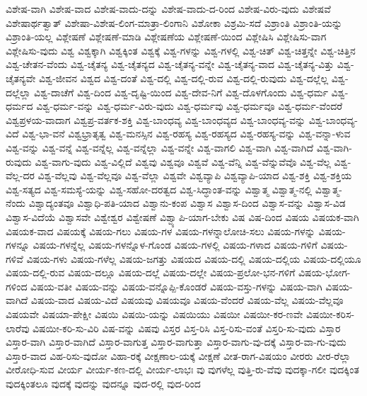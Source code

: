 {ವಿಶೇಷ-ವಾಗಿ
ವಿಶೇಷ-ವಾದ
ವಿಶೇಷ-ವಾದು-ದನ್ನು
ವಿಶೇಷ-ವಾದು-ದ-ರಿಂದ
ವಿಶೇಷ-ವಿರು-ವುದು
ವಿಶೇಷವೆ
ವಿಶೇಷಾರ್ಥತ್ವಾತ್
ವಿಶೇಷಾ-ವಿಶೇಷ-ಲಿಂಗ-ಮಾತ್ರಾ-ಲಿಂಗಾನಿ
ವಿಶೋಕಾ
ವಿಶ್ರಮಿ-ಸದೆ
ವಿಶ್ರಾಂತಿ
ವಿಶ್ರಾಂತಿ-ಯನ್ನು
ವಿಶ್ರಾಂತಿ-ಯಲ್ಲ
ವಿಶ್ಲೇಷಣೆ
ವಿಶ್ಲೇಷಣೆ-ಮಾಡಿ
ವಿಶ್ಲೇಷಣೆಯ
ವಿಶ್ಲೇಷಣೆ-ಯಿಂದ
ವಿಶ್ಲೇಷಿಸಿ
ವಿಶ್ಲೇಷಿಸು-ವಾಗ
ವಿಶ್ಲೇಷಿಸು-ವುದು
ವಿಶ್ವ
ವಿಶ್ವಕ್ಕಾಗಿ
ವಿಶ್ವಕ್ಕಿಂತ
ವಿಶ್ವಕ್ಕೆ
ವಿಶ್ವ-ಗಳನ್ನು
ವಿಶ್ವ-ಗಳಲ್ಲಿ
ವಿಶ್ವ-ಚಿತ್
ವಿಶ್ವ-ಚಿತ್ತನ್ನೇ
ವಿಶ್ವ-ಚಿತ್ತಿನ
ವಿಶ್ವ-ಚೇತನ-ವೆಂದು
ವಿಶ್ವ-ಚೈತನ್ಯ
ವಿಶ್ವ-ಚೈತನ್ಯದ
ವಿಶ್ವ-ಚೈತನ್ಯ-ವನ್ನೇ
ವಿಶ್ವ-ಚೈತನ್ಯ-ವಾದ
ವಿಶ್ವ-ಚೈತನ್ಯ-ವಿತ್ತು
ವಿಶ್ವ-ಚೈತನ್ಯವೇ
ವಿಶ್ವ-ಜೀವನ
ವಿಶ್ವದ
ವಿಶ್ವ-ದಂತೆ
ವಿಶ್ವ-ದಲ್ಲಿ
ವಿಶ್ವ-ದಲ್ಲಿ-ರುವ
ವಿಶ್ವ-ದಲ್ಲಿ-ರುವುದು
ವಿಶ್ವ-ದಲ್ಲೆಲ್ಲ
ವಿಶ್ವ-ದಲ್ಲೆಲ್ಲಾ
ವಿಶ್ವ-ದಾಚೆಗೆ
ವಿಶ್ವ-ದಿಂದ
ವಿಶ್ವ-ದೃಷ್ಟಿ-ಯಿಂದ
ವಿಶ್ವ-ದೇವ-ನಿಗೆ
ವಿಶ್ವ-ದೊಳಗೊಂದು
ವಿಶ್ವ-ಧರ್ಮ
ವಿಶ್ವ-ಧರ್ಮದ
ವಿಶ್ವ-ಧರ್ಮ-ವನ್ನು
ವಿಶ್ವ-ಧರ್ಮ-ವಿರು-ವುದು
ವಿಶ್ವ-ಧರ್ಮವು
ವಿಶ್ವ-ಧರ್ಮವೂ
ವಿಶ್ವ-ಧರ್ಮ-ವೆಂದರೆ
ವಿಶ್ವಪ್ರಳಯ-ವಾದಾಗ
ವಿಶ್ವಪ್ರ-ವರ್ತಕ-ಶಕ್ತಿ
ವಿಶ್ವ-ಬಾಂಧವ್ಯ
ವಿಶ್ವ-ಬಾಂಧವ್ಯದ
ವಿಶ್ವ-ಬಾಂಧವ್ಯ-ವನ್ನು
ವಿಶ್ವ-ಬಾಂಧವ್ಯ-ವಿದೆ
ವಿಶ್ವ-ಭಾ-ವನೆ
ವಿಶ್ವಭ್ರಾತೃತ್ವ
ವಿಶ್ವ-ಮನಸ್ಸಿನ
ವಿಶ್ವ-ರಹಸ್ಯ
ವಿಶ್ವ-ರಹಸ್ಯದ
ವಿಶ್ವ-ರಹಸ್ಯ-ವನ್ನು
ವಿಶ್ವ-ವನ್ನಾ-ಳುವ
ವಿಶ್ವ-ವನ್ನು
ವಿಶ್ವ-ವನ್ನೆ
ವಿಶ್ವ-ವನ್ನೆಲ್ಲ
ವಿಶ್ವ-ವನ್ನೆಲ್ಲಾ
ವಿಶ್ವ-ವನ್ನೇ
ವಿಶ್ವ-ವಾಗಲಿ
ವಿಶ್ವ-ವಾಗಿ
ವಿಶ್ವ-ವಾಗಿದೆ
ವಿಶ್ವ-ವಾಗಿ-ರುವುದು
ವಿಶ್ವ-ವಾಗು-ವುದು
ವಿಶ್ವ-ವಿಲ್ಲಿದೆ
ವಿಶ್ವವು
ವಿಶ್ವವೂ
ವಿಶ್ವವೆ
ವಿಶ್ವ-ವೆನ್ನಿ
ವಿಶ್ವ-ವೆನ್ನುವೆವೊ
ವಿಶ್ವ-ವೆಲ್ಲ
ವಿಶ್ವ-ವೆಲ್ಲ-ದರ
ವಿಶ್ವ-ವೆಲ್ಲವು
ವಿಶ್ವ-ವೆಲ್ಲವೂ
ವಿಶ್ವ-ವೆಲ್ಲಾ
ವಿಶ್ವವೇ
ವಿಶ್ವವ್ಯಾಪಿ
ವಿಶ್ವವ್ಯಾಪಿ-ಯಾದ
ವಿಶ್ವ-ಶಕ್ತಿ
ವಿಶ್ವ-ಶಕ್ತಿಯ
ವಿಶ್ವ-ಸತ್ಯದ
ವಿಶ್ವ-ಸಮಸ್ಯೆ-ಯನ್ನು
ವಿಶ್ವ-ಸಹೋ-ದರತ್ವದ
ವಿಶ್ವ-ಸಿದ್ಧಾಂತ-ವನ್ನು
ವಿಶ್ವಾತ್ಮ
ವಿಶ್ವಾತ್ಮ-ನಲ್ಲಿ
ವಿಶ್ವಾತ್ಮ-ನೆಂದು
ವಿಶ್ವಾದ್ಯಂತವೂ
ವಿಶ್ವಾಧಿ-ಪತಿ-ಯಾದ
ವಿಶ್ವಾನು-ಕಂಪ
ವಿಶ್ವಾಸ
ವಿಶ್ವಾಸ-ದಿಂದ
ವಿಶ್ವಾಸ-ವನ್ನು
ವಿಶ್ವಾಸ-ವಿಡ
ವಿಶ್ವಾಸ-ವಿದೆಯೆ
ವಿಶ್ವಾಸವೇ
ವಿಶ್ವೇಶ್ವರ
ವಿಶ್ವೇಷಣೆ
ವಿಶ್ವ್ಯಾಪಿ-ಯಾಗ-ಬೇಕು
ವಿಷ
ವಿಷ-ದಿಂದ
ವಿಷಯ
ವಿಷಯಕ-ವಾಗಿ
ವಿಷಯಕ-ವಾದ
ವಿಷಯಕ್ಕೆ
ವಿಷಯ-ಗಲು
ವಿಷಯ-ಗಳ
ವಿಷಯ-ಗಳನ್ನಾಲೋಚಿ-ಸಲು
ವಿಷಯ-ಗಳನ್ನು
ವಿಷಯ-ಗಳನ್ನೂ
ವಿಷಯ-ಗಳನ್ನೆಲ್ಲ
ವಿಷಯ-ಗಳನ್ನೊಳ-ಗೊಂಡ
ವಿಷಯ-ಗಳಲ್ಲಿ
ವಿಷಯ-ಗಳಾದ
ವಿಷಯ-ಗಳಿಗೆ
ವಿಷಯ-ಗಳಿವೆ
ವಿಷಯ-ಗಳು
ವಿಷಯ-ಗಳೆಲ್ಲ
ವಿಷಯ-ಜಗತ್ತು
ವಿಷಯದ
ವಿಷಯ-ದಲ್ಲಿ
ವಿಷಯ-ದಲ್ಲಿಯ
ವಿಷಯ-ದಲ್ಲಿಯೂ
ವಿಷಯ-ದಲ್ಲಿ-ರುವ
ವಿಷಯ-ದಲ್ಲೂ
ವಿಷಯ-ದಲ್ಲೆ
ವಿಷಯ-ದಲ್ಲೇ
ವಿಷಯ-ಪ್ರಲೋ-ಭನ-ಗಳಿಗೆ
ವಿಷಯ-ಭೋಗ-ಗಳಿಂದ
ವಿಷಯ-ವತೀ
ವಿಷಯ-ವನ್ನು
ವಿಷಯ-ವನ್ನೊಪ್ಪಿ-ಕೊಂಡರೆ
ವಿಷಯ-ವಸ್ತು-ಗಳನ್ನು
ವಿಷಯ-ವಾಗಿ
ವಿಷಯ-ವಾಗಿದೆ
ವಿಷಯ-ವಾದ
ವಿಷಯ-ವಿದೆ
ವಿಷಯವು
ವಿಷಯವೂ
ವಿಷಯ-ವೆಂದರೆ
ವಿಷಯ-ವೆಲ್ಲ
ವಿಷಯ-ವೆಲ್ಲವೂ
ವಿಷಯವೇ
ವಿಷಯಾ-ಪೇಕ್ಷೀ
ವಿಷಯಿ
ವಿಷಯಿ-ಯನ್ನು
ವಿಷಯಿಯು
ವಿಷಯೀ
ವಿಷಯೀ-ಕರ-ಣವೇ
ವಿಷಯೀ-ಕರಿಸ-ಲಾರೆವು
ವಿಷಯೀ-ಕರಿ-ಸು-ವಿರಿ
ವಿಷ-ವನ್ನು
ವಿಷವು
ವಿಸ್ತರ
ವಿಸ್ತ-ರಿಸಿ
ವಿಸ್ತ-ರಿಸು-ವಂತೆ
ವಿಸ್ತರಿ-ಸು-ವುದು
ವಿಸ್ತಾರ
ವಿಸ್ತಾರ-ವಾಗಿ
ವಿಸ್ತಾರ-ವಾಗಿದೆ
ವಿಸ್ತಾರ-ವಾಗುತ್ತ
ವಿಸ್ತಾರ-ವಾಗುತ್ತಾ
ವಿಸ್ತಾರ-ವಾಗು-ವು-ದಕ್ಕೆ
ವಿಸ್ತಾರ-ವಾ-ಗು-ವುದು
ವಿಸ್ತಾರ-ವಾದ
ವಿಹ-ರಿಸು-ವುದೋ
ವಿಹಾ-ರಕ್ಕೆ
ವೀಕ್ಷಣಾಲ-ಯಕ್ಕೆ
ವೀಕ್ಷಣೆ
ವೀತ-ರಾಗ-ವಿಷಯಂ
ವೀರರು
ವೀರ-ರೆಲ್ಲಾ
ವೀರೋಧಿ-ಸುವ
ವೀರ್ಯ
ವೀರ್ಯ-ಕಣ-ದಲ್ಲಿ
ವೀರ್ಯ-ಲಾಭಃ
ವು
ವುಗಳೆಲ್ಲ
ವುತ್ತಿ-ರು-ವೆವು
ವುದಕ್ಕಾ-ಗಲೀ
ವುದಕ್ಕಿಂತ
ವುದಕ್ಕಿಂತಲೂ
ವುದಕ್ಕೆ
ವುದನ್ನು
ವುದನ್ನೂ
ವುದ-ರಲ್ಲಿ
ವುದ-ರಿಂದ
}
